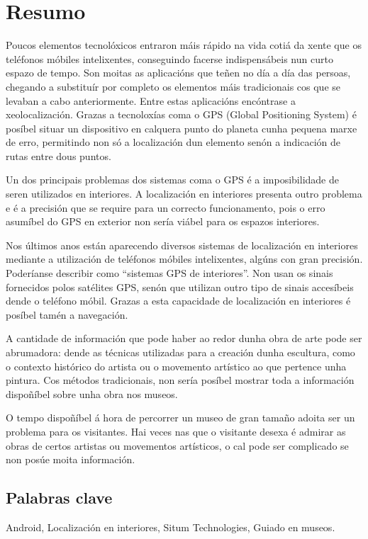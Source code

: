 \chapter*{Resumo}

Poucos elementos tecnolóxicos entraron máis rápido na vida cotiá da xente que os teléfonos móbiles intelixentes, conseguindo facerse indispensábeis nun curto espazo de tempo. Son moitas as aplicacións que teñen no día a día das persoas, chegando a substituír por completo os elementos máis tradicionais cos que se levaban a cabo anteriormente. Entre estas aplicacións encóntrase a xeolocalización. Grazas a tecnoloxías coma o GPS (Global Positioning System) é posíbel situar un dispositivo en calquera punto do planeta cunha pequena marxe de erro, permitindo non só a localización dun elemento senón a indicación de rutas entre dous puntos.

Un dos principais problemas dos sistemas coma o GPS é a imposibilidade de seren utilizados en interiores. A localización en interiores presenta outro problema e é a precisión que se require para un correcto funcionamento, pois o erro asumíbel do GPS en exterior non sería viábel para os espazos interiores.

Nos últimos anos están aparecendo diversos sistemas de localización en interiores mediante a utilización de teléfonos móbiles intelixentes, algúns con gran precisión. Poderíanse describir como “sistemas GPS de interiores”. Non usan os sinais fornecidos polos satélites GPS, senón que utilizan outro tipo de sinais accesíbeis dende o teléfono móbil. Grazas a esta capacidade de localización en interiores é posíbel tamén a navegación.

A cantidade de información que pode haber ao redor dunha obra de arte pode ser abrumadora: dende as técnicas utilizadas para a creación dunha escultura, como o contexto histórico do artista ou o movemento artístico ao que pertence unha pintura. Cos métodos tradicionais, non sería posíbel mostrar toda a información dispoñíbel sobre unha obra nos museos.

O tempo dispoñíbel á hora de percorrer un museo de gran tamaño adoita ser un problema para os visitantes. Hai veces nas que o visitante desexa é admirar as obras de certos artistas ou movementos artísticos, o cal pode ser complicado se non posúe moita información.

\section*{Palabras clave}

Android, Localización en interiores, Situm Technologies, Guiado en museos.
